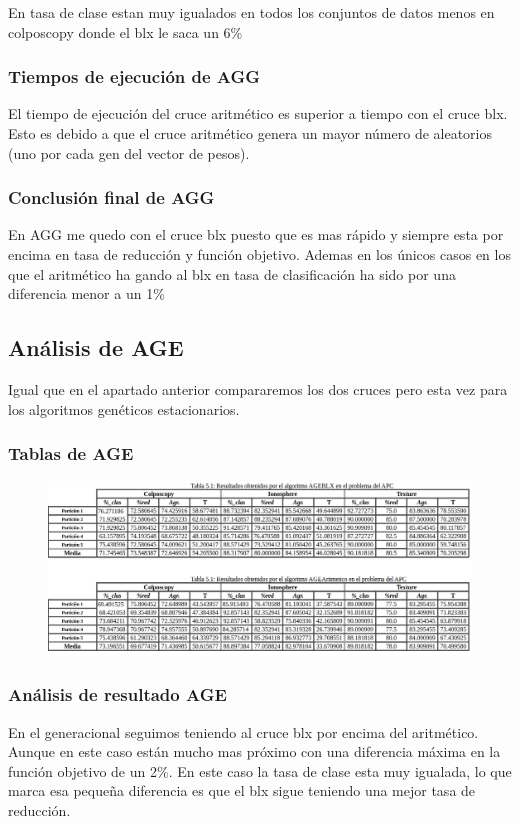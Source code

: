 \documentclass[titlepage]{article}
\begin{document}
	En tasa de clase estan muy igualados en todos los conjuntos de datos menos en colposcopy donde el blx le saca un 6\%
	\subsubsection{Tiempos de ejecución de AGG}
	El tiempo de ejecución del cruce aritmético es superior a tiempo con el cruce blx. Esto es debido a que el cruce aritmético genera un mayor número de aleatorios (uno por cada gen del vector de pesos).
	\subsubsection{Conclusión final de AGG}
	En AGG me quedo con el cruce blx puesto que es mas rápido y siempre esta por encima en tasa de reducción y función objetivo. Ademas en los únicos casos en los que el aritmético ha gando al blx en tasa de clasificación ha sido por una diferencia menor a un 1\%
	
	\subsection{Análisis de AGE}
	Igual que en el apartado anterior compararemos los dos cruces pero esta vez para los algoritmos genéticos estacionarios.
	
	\subsubsection{Tablas de AGE}
	\begin{figure}[H]
		\centering
		\includegraphics[width=1\linewidth]{screenshot006}
		\caption{}
		\label{fig:screenshot006}
	\end{figure}
	
	
	\subsubsection{Análisis de resultado AGE}
	En el generacional seguimos teniendo al cruce blx por encima del aritmético. Aunque en este caso están mucho mas próximo con una diferencia máxima en la función objetivo de un 2\%. En este caso la tasa de clase esta muy igualada, lo que marca esa pequeña diferencia es que el blx sigue teniendo una mejor tasa de reducción.
	
\end{document}
